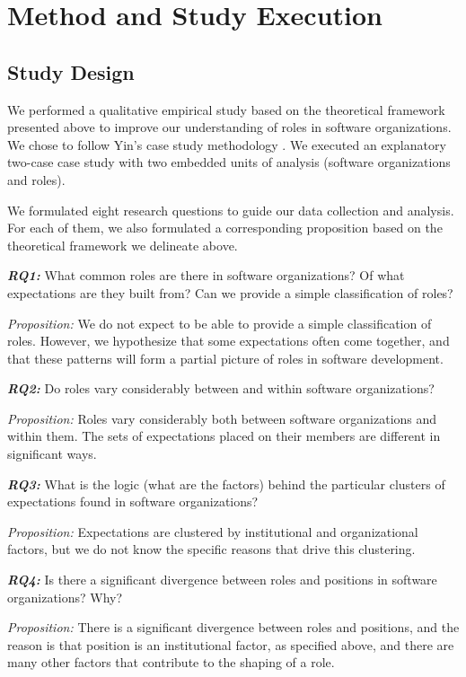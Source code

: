 \documentclass[10pt, conference, compsocconf]{IEEEtran}
\begin{document}

\section{Method and Study Execution}

\subsection{Study Design}

We performed a qualitative empirical study based on the theoretical framework presented above to improve our understanding of roles in software organizations. We chose to follow Yin's case study methodology \cite{Yin2003}. We executed an explanatory two-case case study with two embedded units of analysis (software organizations and roles).

We formulated eight research questions to guide our data collection and analysis. For each of them, we also formulated a corresponding proposition based on the theoretical framework we delineate above.

\textbf{\emph{RQ1:}} What common roles are there in software organizations? Of what expectations are they built from? Can we provide a simple classification of roles?

\emph{Proposition:} We do not expect to be able to provide a simple classification of roles. However, we hypothesize that some expectations often come together, and that these patterns will form a partial picture of roles in software development.

\textbf{\emph{RQ2:}} Do roles vary considerably between and within software organizations?

\emph{Proposition:} Roles vary considerably both between software organizations and within them. The sets of expectations placed on their members are different in significant ways.

\textbf{\emph{RQ3:}} What is the logic (what are the factors) behind the particular clusters of expectations found in software organizations?

\emph{Proposition:} Expectations are clustered by institutional and organizational factors, but we do not know the specific reasons that drive this clustering.

\textbf{\emph{RQ4:}} Is there a significant divergence between roles and positions in software organizations? Why?

\emph{Proposition:} There is a significant divergence between roles and positions, and the reason is that position is an institutional factor, as specified above, and there are many other factors that contribute to the shaping of a role.
\end{document}

